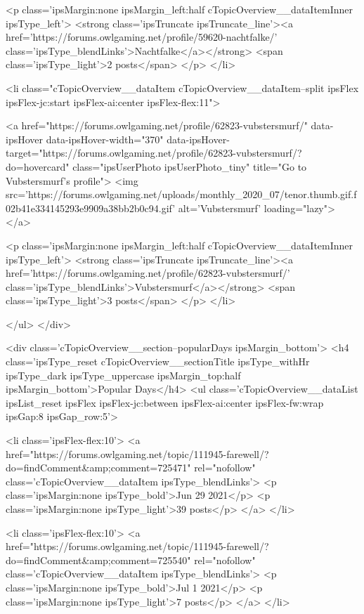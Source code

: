 							<p class='ipsMargin:none ipsMargin_left:half cTopicOverview__dataItemInner ipsType_left'>
								<strong class='ipsTruncate ipsTruncate_line'><a href='https://forums.owlgaming.net/profile/59620-nachtfalke/' class='ipsType_blendLinks'>Nachtfalke</a></strong>
								<span class='ipsType_light'>2 posts</span>
							</p>
						</li>
					
						<li class="cTopicOverview__dataItem cTopicOverview__dataItem--split ipsFlex ipsFlex-jc:start ipsFlex-ai:center ipsFlex-flex:11">
							


	<a href="https://forums.owlgaming.net/profile/62823-vubstersmurf/" data-ipsHover data-ipsHover-width="370" data-ipsHover-target="https://forums.owlgaming.net/profile/62823-vubstersmurf/?do=hovercard" class="ipsUserPhoto ipsUserPhoto_tiny" title="Go to Vubstersmurf's profile">
		<img src='https://forums.owlgaming.net/uploads/monthly_2020_07/tenor.thumb.gif.f02b41e334145293e9909a38bb2b0c94.gif' alt='Vubstersmurf' loading="lazy">
	</a>

							<p class='ipsMargin:none ipsMargin_left:half cTopicOverview__dataItemInner ipsType_left'>
								<strong class='ipsTruncate ipsTruncate_line'><a href='https://forums.owlgaming.net/profile/62823-vubstersmurf/' class='ipsType_blendLinks'>Vubstersmurf</a></strong>
								<span class='ipsType_light'>3 posts</span>
							</p>
						</li>
					
				</ul>
			</div>
		
		
			<div class='cTopicOverview__section--popularDays ipsMargin_bottom'>
				<h4 class='ipsType_reset cTopicOverview__sectionTitle ipsType_withHr ipsType_dark ipsType_uppercase ipsMargin_top:half ipsMargin_bottom'>Popular Days</h4>
				<ul class='cTopicOverview__dataList ipsList_reset ipsFlex ipsFlex-jc:between ipsFlex-ai:center ipsFlex-fw:wrap ipsGap:8 ipsGap_row:5'>
					
						<li class='ipsFlex-flex:10'>
							<a href="https://forums.owlgaming.net/topic/111945-farewell/?do=findComment&amp;comment=725471" rel="nofollow" class='cTopicOverview__dataItem ipsType_blendLinks'>
								<p class='ipsMargin:none ipsType_bold'>Jun 29 2021</p>
								<p class='ipsMargin:none ipsType_light'>39 posts</p>
							</a>
						</li>
					
						<li class='ipsFlex-flex:10'>
							<a href="https://forums.owlgaming.net/topic/111945-farewell/?do=findComment&amp;comment=725540" rel="nofollow" class='cTopicOverview__dataItem ipsType_blendLinks'>
								<p class='ipsMargin:none ipsType_bold'>Jul 1 2021</p>
								<p class='ipsMargin:none ipsType_light'>7 posts</p>
							</a>
						</li>
					
